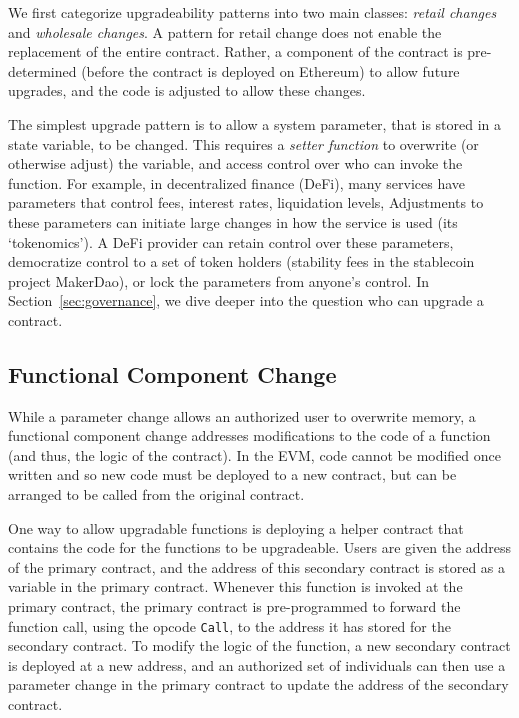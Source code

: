 We first categorize upgradeability patterns into two main classes: \textit{retail changes} and \textit{wholesale changes}. A pattern for retail change does not enable the replacement of the entire contract. Rather, a component of the contract is pre-determined (before the contract is deployed on Ethereum) to allow future upgrades, and the code is adjusted to allow these changes. 

The simplest upgrade pattern is to allow a system parameter, that is stored in a state variable, to be changed. This requires a \textit{setter function} to overwrite (or otherwise adjust) the variable, and access control over who can invoke the function. For example, in decentralized finance (DeFi), many services have parameters that control fees, interest rates, liquidation levels, \etc Adjustments to these parameters can initiate large changes in how the service is used (its `tokenomics'). A DeFi provider can retain control over these parameters, democratize control to a set of token holders (\eg stability fees in the stablecoin project MakerDao), or lock the parameters from anyone's control. In Section~\ref{sec:governance}, we dive deeper into the question who can upgrade a contract. 


\subsection{Functional Component Change}
\label{sec:component}

While a parameter change allows an authorized user to overwrite memory, a functional component change addresses modifications to the code of a function (and thus, the logic of the contract). In the EVM, code cannot be modified once written and so new code must be deployed to a new contract, but can be arranged to be called from the original contract. 

One way to allow upgradable functions is deploying a helper contract that contains the code for the functions to be upgradeable. Users are given the address of the primary contract, and the address of this secondary contract is stored as a variable in the primary contract. Whenever this function is invoked at the primary contract, the primary contract is pre-programmed to forward the function call, using the opcode \texttt{Call}, to the address it has stored for the secondary contract. To modify the logic of the function, a new secondary contract is deployed at a new address, and an authorized set of individuals can then use a parameter change in the primary contract to update the address of the secondary contract.

